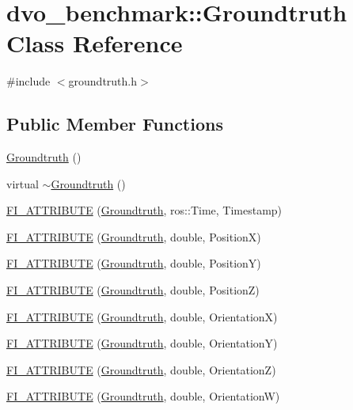 \hypertarget{classdvo__benchmark_1_1_groundtruth}{}\section{dvo\+\_\+benchmark\+:\+:Groundtruth Class Reference}
\label{classdvo__benchmark_1_1_groundtruth}


{\ttfamily \#include $<$groundtruth.\+h$>$}

\subsection*{Public Member Functions}
\begin{DoxyCompactItemize}
\item 
\mbox{\hyperlink{classdvo__benchmark_1_1_groundtruth_adb2acf16f7f0a87f92db5e74876e4f2e}{Groundtruth}} ()
\item 
virtual \mbox{\hyperlink{classdvo__benchmark_1_1_groundtruth_a650239cd5e1ca8fa434e5121e7c4d727}{$\sim$\+Groundtruth}} ()
\item 
\mbox{\hyperlink{classdvo__benchmark_1_1_groundtruth_a8c504fb35eeba591d8ca830223081e1b}{F\+I\+\_\+\+A\+T\+T\+R\+I\+B\+U\+TE}} (\mbox{\hyperlink{classdvo__benchmark_1_1_groundtruth}{Groundtruth}}, ros\+::\+Time, Timestamp)
\item 
\mbox{\hyperlink{classdvo__benchmark_1_1_groundtruth_ab8ed989b9db899b7718bdb291eb18d30}{F\+I\+\_\+\+A\+T\+T\+R\+I\+B\+U\+TE}} (\mbox{\hyperlink{classdvo__benchmark_1_1_groundtruth}{Groundtruth}}, double, PositionX)
\item 
\mbox{\hyperlink{classdvo__benchmark_1_1_groundtruth_a524307c4f6c2cad806dfe36f777b7ce1}{F\+I\+\_\+\+A\+T\+T\+R\+I\+B\+U\+TE}} (\mbox{\hyperlink{classdvo__benchmark_1_1_groundtruth}{Groundtruth}}, double, PositionY)
\item 
\mbox{\hyperlink{classdvo__benchmark_1_1_groundtruth_a5775b082016a04d4a36c94e635eebfde}{F\+I\+\_\+\+A\+T\+T\+R\+I\+B\+U\+TE}} (\mbox{\hyperlink{classdvo__benchmark_1_1_groundtruth}{Groundtruth}}, double, PositionZ)
\item 
\mbox{\hyperlink{classdvo__benchmark_1_1_groundtruth_abf20e8ba0f0f6dee57f7b75f33ebec31}{F\+I\+\_\+\+A\+T\+T\+R\+I\+B\+U\+TE}} (\mbox{\hyperlink{classdvo__benchmark_1_1_groundtruth}{Groundtruth}}, double, OrientationX)
\item 
\mbox{\hyperlink{classdvo__benchmark_1_1_groundtruth_a3459d282fe7b5814c99bccfcfb6f3fd9}{F\+I\+\_\+\+A\+T\+T\+R\+I\+B\+U\+TE}} (\mbox{\hyperlink{classdvo__benchmark_1_1_groundtruth}{Groundtruth}}, double, OrientationY)
\item 
\mbox{\hyperlink{classdvo__benchmark_1_1_groundtruth_a1455c5f99d9e4426b4c74f95601ad1a8}{F\+I\+\_\+\+A\+T\+T\+R\+I\+B\+U\+TE}} (\mbox{\hyperlink{classdvo__benchmark_1_1_groundtruth}{Groundtruth}}, double, OrientationZ)
\item 
\mbox{\hyperlink{classdvo__benchmark_1_1_groundtruth_ae6d3747350b8a343c26ccd1a886ac600}{F\+I\+\_\+\+A\+T\+T\+R\+I\+B\+U\+TE}} (\mbox{\hyperlink{classdvo__benchmark_1_1_groundtruth}{Groundtruth}}, double, OrientationW)
\end{DoxyCompactItemize}

